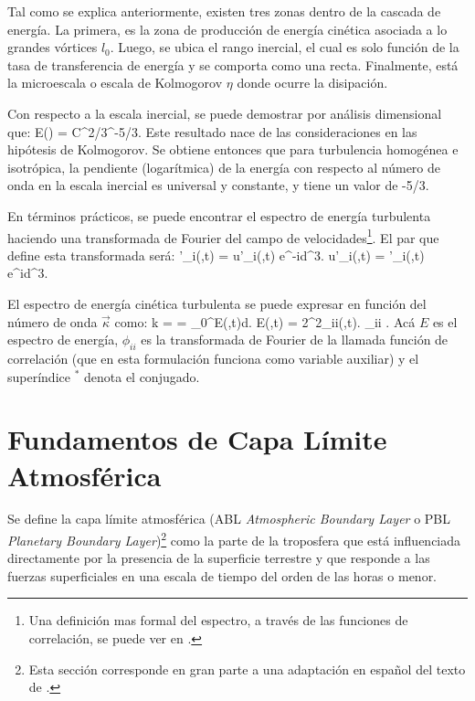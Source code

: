 Tal como se explica anteriormente, existen tres zonas dentro de la cascada de energía. La primera, es la zona de producción de energía cinética asociada a lo grandes vórtices $l_0$. Luego, se ubica el rango inercial, el cual es solo función de la tasa de transferencia de energía y se comporta como una recta. Finalmente, está la microescala o escala de Kolmogorov $\eta$ donde ocurre la disipación.

Con respecto a la escala inercial, se puede demostrar por análisis dimensional que:
\be E(\kappa) = C\varepsilon^{2/3}\kappa^{-5/3}. \ee
Este resultado nace de las consideraciones en las hipótesis de Kolmogorov. Se obtiene entonces que para turbulencia homogénea e isotrópica, la pendiente (logarítmica) de la energía con respecto al número de onda en la escala inercial es universal y constante, y tiene un valor de -5/3.

En términos prácticos, se puede encontrar el espectro de energía turbulenta haciendo una transformada de Fourier del campo de velocidades\footnote{Una definición mas formal del espectro, a través de las funciones de correlación, se puede ver en \cite{9780521775380}.}. El par que define esta transformada será:
\be {}'_i(\vec{\kappa},t) = \int u'_i(,t) e^{-i\vec{\kappa}\cdot{}}d^3. \ee
\be u'_i(,t) = \int {}'_i(\vec{\kappa},t) e^{i\vec{\kappa}\cdot{}}d^3\vec{\kappa}. \ee

El espectro de energía cinética turbulenta se puede expresar en función del número de onda $\vec{\kappa}$ como:
\be 
k =  = \int\limits_0^\infty E(\kappa,t)d\kappa.
\ee
\be
E(\kappa,t) = 2\pi\kappa^2\phi_{ii}(\kappa,t).
\ee 
\be 
\phi_{ii} \approx {}.
\ee
Acá $E$ es el espectro de energía, $\phi_{ii}$ es la transformada de Fourier de la llamada función de correlación (que en esta formulación funciona como variable auxiliar) y el superíndice $^*$ denota el conjugado.






\newpage 
\section{Fundamentos de Capa Límite Atmosférica}
Se define la capa límite atmosférica (ABL \emph{Atmospheric Boundary Layer} o PBL \emph{Planetary Boundary Layer})\footnote{Esta sección corresponde en gran parte a una adaptación en español del texto de \cite{stull1988introduction}.} como la parte de la troposfera que está influenciada directamente por la presencia de la superficie terrestre y que responde a las fuerzas superficiales en una escala de tiempo del orden de las horas o menor.

